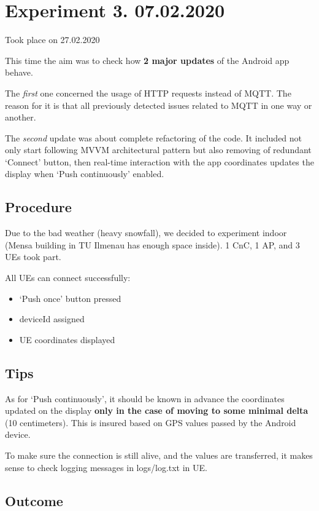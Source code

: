 \section{Experiment 3. 07.02.2020}\label{experiment-3.-07.02.2020}

Took place on 27.02.2020

This time the aim was to check how \textbf{2 major updates} of the Android app behave.

The \emph{first} one concerned the usage of HTTP requests instead of MQTT. The reason for it is that all previously detected issues related to MQTT in one way or another.

The \emph{second} update was about complete refactoring of the code. It included not only start following MVVM architectural pattern but also removing of redundant `Connect' button, then real-time interaction with the app coordinates updates the display when `Push continuously' enabled.

\subsection{Procedure}\label{procedure}

Due to the bad weather (heavy snowfall), we decided to experiment indoor (Mensa building in TU Ilmenau has enough space inside). 1 CnC, 1 AP, and 3 UEs took part.

All UEs can connect successfully:

\begin{itemize}
\tightlist
\item
  `Push once' button pressed
\item
  deviceId assigned
\item
  UE coordinates displayed
\end{itemize}

\subsection{Tips}\label{tips}

As for `Push continuously', it should be known in advance the
coordinates updated on the display \textbf{only in the case of moving to
some minimal delta} (10 centimeters). This is insured based on GPS
values passed by the Android device.

To make sure the connection is still alive, and the values are transferred, it makes sense to check logging messages in logs/log.txt in UE.

\subsection{Outcome}\label{outcome}


